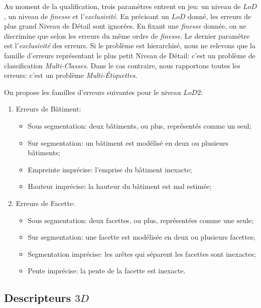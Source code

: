 \documentclass[a4paper,french]{article}
\begin{document}
    Au moment de la qualification, trois paramètres entrent en jeu: un niveau de $LoD$, un niveau de \emph{finesse} et l'\emph{exclusivité}. En précisant un $LoD$ donné, les erreurs de plus grand Niveau de Détail sont ignorées. En fixant une \emph{finesse} donnée, on ne discrimine que selon les erreurs du même ordre de \emph{finesse}. Le dernier paramètre est l'\emph{exclusivité} des erreurs. Si le problème est hierarchisé, nous ne relevons que la famille d'erreurs représentant le plus petit Niveau de Détail: c'est un problème de classification \textit{Multi-Classes}. Dans le cas contraire, nous rapportons toutes les erreurs: c'est un problème \textit{Multi-\'Etiquettes}.

    On propose les familles d'erreurs suivantes pour le niveau $LoD 2$:

    \begin{enumerate}[label= (\roman*)., itemsep=0pt]
        \item Erreurs de Bâtiment:
        \begin{itemize}[itemsep=0pt]
            \item Sous segmentation: deux bâtiments, ou plus, représentés comme un seul;
            \item Sur segmentation: un bâtiment est modélisé en deux ou plusieurs bâtiments;
            \item Empreinte imprécise: l'emprise du bâtiment inexacte;
            \item Hauteur imprécise: la hauteur du bâtiment est mal estimée;
        \end{itemize}
        \item Erreurs de Facette:
        \begin{itemize}[itemsep=0pt]
            \item Sous segmentation: deux facettes, ou plus, représentées comme une seule;
            \item Sur segmentation: une facette est modélisée en deux ou plusieurs facettes;
            \item Segmentation imprécise: les arêtes qui séparent les facettes sont inexactes;
            \item Pente imprécise: la pente de la facette est inexacte.
        \end{itemize}
    \end{enumerate}

    \subsection{Descripteurs $3D$}
\end{document}
